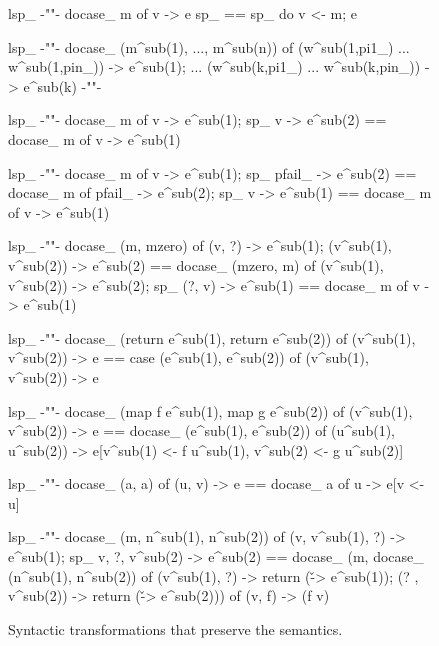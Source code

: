 \documentclass{sigplanconf}
\begin{document}
\begin{figure}
\begin{code}
lsp_
{-""-}
  docase_ m of v -> e sp_ == sp_ do v <- m; e

lsp_
{-""-}
  docase_ (m^sub(1), ..., m^sub(n)) of
    (w^sub(1,pi1_) ... w^sub(1,pin_)) -> e^sub(1); ...
    (w^sub(k,pi1_) ... w^sub(k,pin_)) -> e^sub(k)
  {-""-}

lsp_
{-""-}
    docase_ m of v -> e^sub(1); sp_ v -> e^sub(2)
==  docase_ m of v -> e^sub(1)

lsp_
{-""-}
    docase_ m of v       -> e^sub(1); sp_ pfail_  -> e^sub(2)
==  docase_ m of pfail_  -> e^sub(2); sp_ v       -> e^sub(1)
==  docase_ m of v       -> e^sub(1)

lsp_
{-""-}
    docase_ (m, mzero) of (v, ?)                -> e^sub(1);      (v^sub(1), v^sub(2))  -> e^sub(2)
==  docase_ (mzero, m) of (v^sub(1), v^sub(2))  -> e^sub(2); sp_  (?, v)                -> e^sub(1)
==  docase_ m of v -> e^sub(1)

lsp_
{-""-}
    docase_  (return e^sub(1), return e^sub(2)) of (v^sub(1), v^sub(2)) -> e
==  case (e^sub(1), e^sub(2)) of (v^sub(1), v^sub(2)) -> e

lsp_
{-""-}
    docase_ (map f e^sub(1), map g e^sub(2)) of (v^sub(1), v^sub(2)) -> e
==  docase_ (e^sub(1), e^sub(2)) of (u^sub(1), u^sub(2)) -> e[v^sub(1) <- f u^sub(1), v^sub(2) <- g u^sub(2)]

lsp_
{-""-}
    docase_ (a, a) of (u, v) -> e
==  docase_ a of u -> e[v <- u]

lsp_
{-""-}
    docase_ (m, n^sub(1), n^sub(2)) of 
      (v, v^sub(1), ?) -> e^sub(1); sp_ v, ?, v^sub(2) -> e^sub(2)
==  docase_ (m, docase_ (n^sub(1), n^sub(2)) of
      (v^sub(1), ?) -> return (\v -> e^sub(1)); 
      (? , v^sub(2)) -> return (\v -> e^sub(2))) of (v, f) -> (f v)
\end{code}

\caption{ Syntactic transformations that preserve the semantics. }
\label{fig:transformations}
\end{figure}

\end{document}
